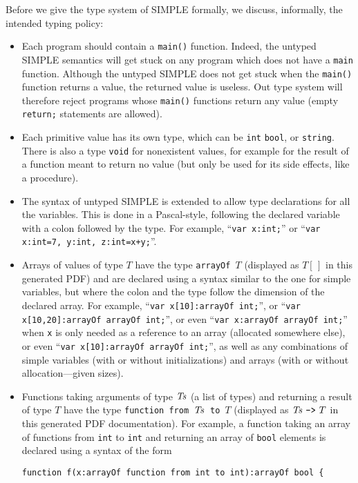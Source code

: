 \begin{kblock}[text]
Before we give the \K type system of SIMPLE formally, we discuss,
informally, the intended typing policy:
\begin{itemize}
\item Each program should contain a \texttt{main()} function.  Indeed,
the untyped SIMPLE semantics will get stuck on any program which does
not have a \texttt{main} function.  Although the untyped SIMPLE does
not get stuck when the \texttt{main()} function returns a value, the
returned value is useless.  Out type system will therefore reject
programs whose \texttt{main()} functions return any value (empty
\texttt{return;} statements are allowed).
\item Each primitive value has its own type, which can be \texttt{int}
\texttt{bool}, or \texttt{string}.  There is also a type \texttt{void}
for nonexistent values, for example for the result of a function meant
to return no value (but only be used for its side effects, like a
procedure).
\item The syntax of untyped SIMPLE is extended to allow type
declarations for all the variables.  This is done in a Pascal-style,
following the declared variable with a colon followed by the type.
For example, ``\texttt{var x:int;}'' or ``\texttt{var x:int=7, y:int,
z:int=x+y;}''.  \item Arrays of values of type $T$ have the type
\texttt{arrayOf $T$} (displayed as $T[\,]$ in this generated PDF) and
are declared using a syntax similar to the one for simple variables,
but where the colon and the type follow the dimension of the declared
array.  For example, ``\texttt{var x[10]:arrayOf int;}'', or
``\texttt{var x[10,20]:arrayOf arrayOf int;}'', or even
``\texttt{var x:arrayOf arrayOf int;}'' when \texttt{x} is only needed
as a reference to an array (allocated somewhere else), or even
``\texttt{var x[10]:arrayOf arrayOf int;}'', as well as any
combinations of simple variables (with or without initializations) and
arrays (with or without allocation---given sizes).
\item Functions taking arguments of type $\it Ts$ (a list of types)
and returning a result of type $T$ have the type
\texttt{function from $\it Ts$ to $T$} (displayed as
${\it Ts}\ \texttt{->}\ T$ in this generated PDF documentation).  For
example, a function taking an array of functions from \texttt{int} to
\texttt{int} and returning an array of \texttt{bool} elements is
declared using a syntax of the form
\begin{verbatim}
function f(x:arrayOf function from int to int):arrayOf bool {

\end{verbatim}
\end{itemize}
\end{kblock}
